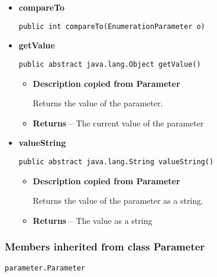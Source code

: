 {{{{{{\begin{itemize}
{\begin{itemize}
{Let the visitor visit this parameter.
}
\item{
{\bf  Parameters}
  \begin{itemize}
   \item{
\texttt{visitor} -- The visitor to visit}
  \end{itemize}
}%
\end{itemize}
}%
\item{ 
{\bf  compareTo}\\
\begin{lstlisting}[frame=none]
public int compareTo(EnumerationParameter o)\end{lstlisting} %
}%
\item{ 
{\bf  getValue}\\
\begin{lstlisting}[frame=none]
public abstract java.lang.Object getValue()\end{lstlisting} %
\begin{itemize}
\item{
{\bf  Description copied from Parameter{\small {}} }

Returns the value of the parameter.
}
\item{{\bf  Returns} -- 
The current value of the parameter 
}%
\end{itemize}
}%
\item{ 
{\bf  valueString}\\
\begin{lstlisting}[frame=none]
public abstract java.lang.String valueString()\end{lstlisting} %
\begin{itemize}
\item{
{\bf  Description copied from Parameter{\small {}} }

Returns the value of the parameter as a string.
}
\item{{\bf  Returns} -- 
The value as a string 
}%
\end{itemize}
}%
\end{itemize}
}
\subsubsection{Members inherited from class Parameter }{
\texttt{parameter.Parameter} {\small 
{}}
{\small 

}}}}}}}
